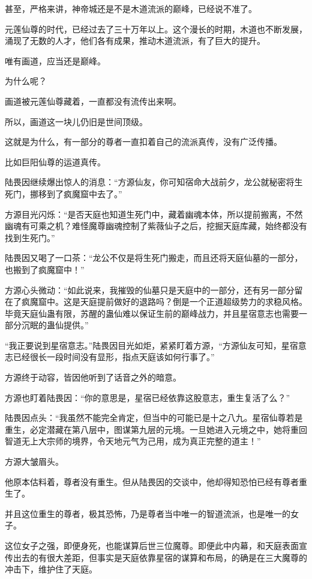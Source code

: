 \begin{this_body}
甚至，严格来讲，神帝城还是不是木道流派的巅峰，已经说不准了。

元莲仙尊的时代，已经过去了三十万年以上。这个漫长的时期，木道也不断发展，涌现了无数的人才，他们各有成果，推动木道流派，有了巨大的提升。

唯有画道，应当还是巅峰。

为什么呢？

画道被元莲仙尊藏着，一直都没有流传出来啊。

所以，画道这一块儿仍旧是世间顶级。

这就是为什么，有一部分的尊者一直扣着自己的流派真传，没有广泛传播。

比如巨阳仙尊的运道真传。

陆畏因继续爆出惊人的消息：“方源仙友，你可知宿命大战前夕，龙公就秘密将生死门，挪移到了疯魔窟中去了。”

方源目光闪烁：“是否天庭也知道生死门中，藏着幽魂本体，所以提前搬离，不然幽魂有可乘之机？难怪魔尊幽魂控制了紫薇仙子之后，挖掘天庭库藏，始终都没有找到生死门。”

陆畏因又喝了一口茶：“龙公不仅是将生死门搬走，而且还将天庭仙墓的一部分，也搬到了疯魔窟中！”

方源心头微动：“如此说来，我摧毁的仙墓只是天庭中的一部分，还有另一部分留在了疯魔窟中。这是天庭提前做好的退路吗？倒是一个正道超级势力的求稳风格。毕竟天庭仙蛊有限，苏醒的蛊仙难以保证生前的巅峰战力，并且星宿意志也需要一部分沉眠的蛊仙提供。”

“我正要说到星宿意志。”陆畏因目光如炬，紧紧盯着方源，“方源仙友可知，星宿意志已经很长一段时间没有显形，指点天庭该如何行事了。”

方源终于动容，皆因他听到了话音之外的暗意。

方源也盯着陆畏因：“你的意思是，星宿已经依靠这股意志，重生复活了么？”

陆畏因点头：“我虽然不能完全肯定，但当中的可能已是十之八九。星宿仙尊若是重生，必定潜藏在第八层中，图谋第九层的元境。一旦她进入元境之中，她将重回智道无上大宗师的境界，令天地元气为己用，成为真正完整的道主！”

方源大皱眉头。

他原本估料着，尊者没有重生。但从陆畏因的交谈中，他却得知恐怕已经有尊者重生了。

并且这位重生的尊者，极其恐怖，乃是尊者当中唯一的智道流派，也是唯一的女子。

这位女子之强，即便身死，也能谋算后世三位魔尊。即便此中内幕，和天庭表面宣传出去的有很大差距，但事实是天庭依靠星宿的谋算和布局，的确是在三大魔尊的冲击下，维护住了天庭。


\end{this_body}
